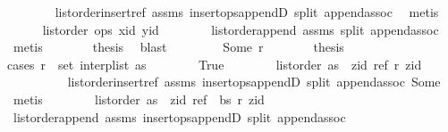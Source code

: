 \begin{isabellebody}
\ \ \ \ \ \ \isamarkupfalse%
\ list{\isacharunderscore}order{\isacharunderscore}insert{\isacharunderscore}ref\ assms{\isacharparenleft}{}{\isacharparenright}\ insert{\isacharunderscore}ops{\isacharunderscore}appendD\ split\ append{\isachardot}assoc\ \isamarkupfalse%
\ metis\isanewline
\ \ \ \ \isamarkupfalse%
\ {\isachardoublequoteopen}list{\isacharunderscore}order\ ops\ xid\ yid{\isachardoublequoteclose}\isanewline
\ \ \ \ \ \ \isamarkupfalse%
\ list{\isacharunderscore}order{\isacharunderscore}append\ assms{\isacharparenleft}{}{\isacharparenright}\ split\ append{\isachardot}assoc\ \isamarkupfalse%
\ metis\isanewline
\ \ \ \ \isamarkupfalse%
\ \isamarkupfalse%
\ {\isacharquery}thesis\ \isamarkupfalse%
\ blast\isanewline
\ \ \isamarkupfalse%
\isanewline
\ \ \ \ \isamarkupfalse%
\ {\isacharparenleft}Some\ r{\isacharparenright}\isanewline
\ \ \ \ \isamarkupfalse%
\ \isamarkupfalse%
\ {\isacharquery}thesis\isanewline
\ \ \ \ \isamarkupfalse%
{\isacharparenleft}cases\ {\isachardoublequoteopen}r\ {\isasymin}\ set\ {\isacharparenleft}interp{\isacharunderscore}list\ as{\isacharparenright}{\isachardoublequoteclose}{\isacharparenright}\isanewline
\ \ \ \ \ \ \isamarkupfalse%
\ True\isanewline
\ \ \ \ \ \ \isamarkupfalse%
\ {\isachardoublequoteopen}list{\isacharunderscore}order\ {\isacharparenleft}as\ {\isacharat}\ {\isacharbrackleft}{\isacharparenleft}zid{\isacharcomma}\ ref{\isacharparenright}{\isacharbrackright}{\isacharparenright}\ r\ zid{\isachardoublequoteclose}\isanewline
\ \ \ \ \ \ \ \ \isamarkupfalse%
\ list{\isacharunderscore}order{\isacharunderscore}insert{\isacharunderscore}ref\ assms{\isacharparenleft}{}{\isacharparenright}\ insert{\isacharunderscore}ops{\isacharunderscore}appendD\ split\ append{\isachardot}assoc\ Some\ \isamarkupfalse%
\ metis\isanewline
\ \ \ \ \ \ \isamarkupfalse%
\ {\isachardoublequoteopen}list{\isacharunderscore}order\ {\isacharparenleft}as\ {\isacharat}\ {\isacharbrackleft}{\isacharparenleft}zid{\isacharcomma}\ ref{\isacharparenright}{\isacharbrackright}\ {\isacharat}\ bs{\isacharparenright}\ r\ zid{\isachardoublequoteclose}\isanewline
\ \ \ \ \ \ \ \ \isamarkupfalse%
\ list{\isacharunderscore}order{\isacharunderscore}append\ assms{\isacharparenleft}{}{\isacharparenright}\ insert{\isacharunderscore}ops{\isacharunderscore}appendD\ split\ append{\isachardot}assoc\ \isamarkupfalse%

\end{isabellebody}
